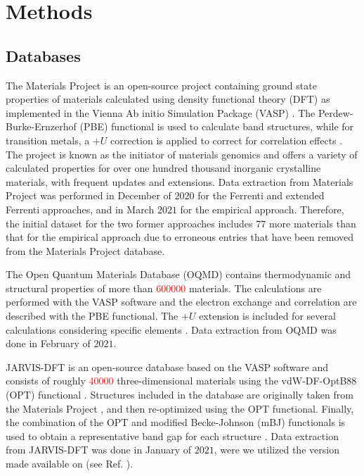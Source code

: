 \documentclass[superscriptaddress,unsortedaddress,
 amsmath,amssymb,
 aps,
]{revtex4-2}
\newcommand{\mrk}[1]{\textcolor{red}{#1}}
\begin{document}
\section*{Methods}

\subsection*{Databases}
The Materials Project \cite{Jain2013, Jain2018} is an open-source project containing ground state properties of materials calculated using density functional theory (DFT) as implemented in the Vienna Ab initio Simulation Package (VASP) \cite{Kresse1996}. The Perdew-Burke-Ernzerhof \cite{Perdew1996} (PBE) functional is used to calculate band structures, while for transition metals, a $+U$ correction is applied to correct for correlation effects \cite{Wang2006}. The project is known as the initiator of materials genomics and offers a variety of calculated properties for over one hundred thousand inorganic crystalline materials, with frequent updates and extensions. Data extraction from Materials Project was performed in December of $2020$ for the Ferrenti and extended Ferrenti approaches, and in March $2021$ for the empirical approach. Therefore, the initial dataset for the two former approaches includes $77$ more materials than that for the empirical approach due to erroneous entries that have been removed from the Materials Project database.

The Open Quantum Materials Database (OQMD) \cite{Saal2013, Kirklin2015} contains thermodynamic and structural properties of more than \mrk{\num{600000}} materials. The calculations are performed with the VASP software and the electron exchange and correlation are described with the PBE functional. The $+U$ extension is included for several calculations considering specific elements \cite{Stevanovic2012}. Data extraction from OQMD was done in February of $2021$.

JARVIS-DFT \cite{Choudhary2020} is an open-source database based on the VASP software and consists of roughly \mrk{\num{40000}} three-dimensional materials using the vdW-DF-OptB88 (OPT) functional \cite{Thonhauser2007, Klimes2011}. Structures included in the database are originally taken from the Materials Project \cite{Jain2013, Jain2018}, and then re-optimized using the OPT functional. Finally, the combination of the OPT and modified Becke-Johnson (mBJ) functionals \cite{Tran2009} is used to obtain a representative band gap for each structure \cite{Choudhary2018a}. Data extraction from JARVIS-DFT was done in January of $2021$, were we utilized the version made available on \mrk{} (see Ref. \cite{Choudhary2020}).
\end{document}
